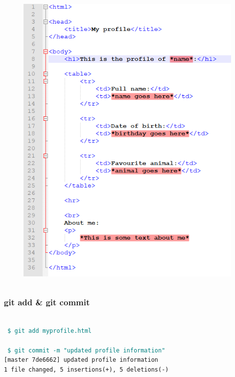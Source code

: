 \documentclass[aspectratio=169]{beamer}
\newcommand{\shellcmd}[1]{~\\ \indent\indent\texttt{\textcolor{teal}{ \$ #1}\\}}
\begin{document}
\begin{frame}
\begin{columns}[T]
\begin{column}{0.4\textwidth}
\begin{block}{}
\begin{figure}
				\includegraphics[height=0.8\textheight]{graphics/profile_edit.png}
			\end{figure}
			
		\end{block}
	\end{column}
\end{columns}


\end{frame}


\begin{frame}
\frametitle{git add \& git commit}

\shellcmd{git add myprofile.html}
\shellcmd{git commit -m "updated profile information"}
\texttt{[master 7de6662] updated profile information\\
	1 file changed, 5 insertions(+), 5 deletions(-)
}

\end{frame}
\end{document}
